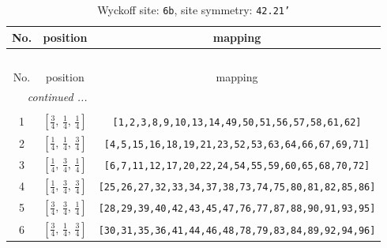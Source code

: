 \documentclass[fleqn,8pt]{jsarticle}
\begin{document}
\begin{longtable}{ccc}
\caption{Wyckoff site: {\tt 6b}, site symmetry: {\tt 42.21'}}
 \\
 \hline \hline
No. & position & mapping \\ \hline \endfirsthead

\multicolumn{2}{l}{\tablename\ \thetable{}} \\
 \hline \hline
No. & position & mapping \\ \hline \endhead

 \hline \hline
\multicolumn{2}{r}{\footnotesize\it continued ...} \\ \endfoot

 \hline \hline
\multicolumn{2}{r}{} \\ \endlastfoot

1 & $\left[ \frac{3}{4},\, \frac{1}{4},\, \frac{1}{4} \right]$ & {\tt [1,2,3,8,9,10,13,14,49,50,51,56,57,58,61,62]} \\ \hline
2 & $\left[ \frac{1}{4},\, \frac{1}{4},\, \frac{3}{4} \right]$ & {\tt [4,5,15,16,18,19,21,23,52,53,63,64,66,67,69,71]} \\ \hline
3 & $\left[ \frac{1}{4},\, \frac{3}{4},\, \frac{1}{4} \right]$ & {\tt [6,7,11,12,17,20,22,24,54,55,59,60,65,68,70,72]} \\ \hline
4 & $\left[ \frac{1}{4},\, \frac{3}{4},\, \frac{3}{4} \right]$ & {\tt [25,26,27,32,33,34,37,38,73,74,75,80,81,82,85,86]} \\ \hline
5 & $\left[ \frac{3}{4},\, \frac{3}{4},\, \frac{1}{4} \right]$ & {\tt [28,29,39,40,42,43,45,47,76,77,87,88,90,91,93,95]} \\ \hline
6 & $\left[ \frac{3}{4},\, \frac{1}{4},\, \frac{3}{4} \right]$ & {\tt [30,31,35,36,41,44,46,48,78,79,83,84,89,92,94,96]} \\
\end{longtable}
\renewcommand{\arraystretch}{1.2}
\end{document}
